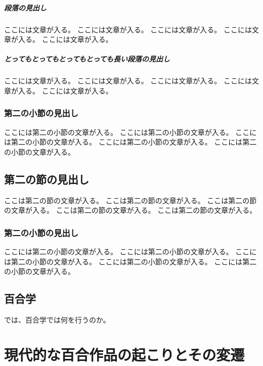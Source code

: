 \documentclass[ %
	uplatex,%
	a5paper,%
	papersize%
	]{jsbook}
\begin{document}
	\paragraph{段落の見出し}

	ここには文章が入る。
	ここには文章が入る。
	ここには文章が入る。
	ここには文章が入る。
	ここには文章が入る。

	\paragraph{とってもとってもとってもとっても長い段落の見出し}

	ここには文章が入る。
	ここには文章が入る。
	ここには文章が入る。
	ここには文章が入る。
	ここには文章が入る。

	\subsection{第二の小節の見出し}

	ここには第二の小節の文章が入る。
	ここには第二の小節の文章が入る。
	ここには第二の小節の文章が入る。
	ここには第二の小節の文章が入る。
	ここには第二の小節の文章が入る。

	\section{第二の節の見出し}

	ここは第二の節の文章が入る。
	ここは第二の節の文章が入る。
	ここは第二の節の文章が入る。
	ここは第二の節の文章が入る。
	ここは第二の節の文章が入る。

	\subsection{第二の小節の見出し}

	ここには第二の小節の文章が入る。
	ここには第二の小節の文章が入る。
	ここには第二の小節の文章が入る。
	ここには第二の小節の文章が入る。
	ここには第二の小節の文章が入る。
	
	\section{百合学}
	では、百合学では何を行うのか。


	\chapter{現代的な百合作品の起こりとその変遷}
\end{document}
